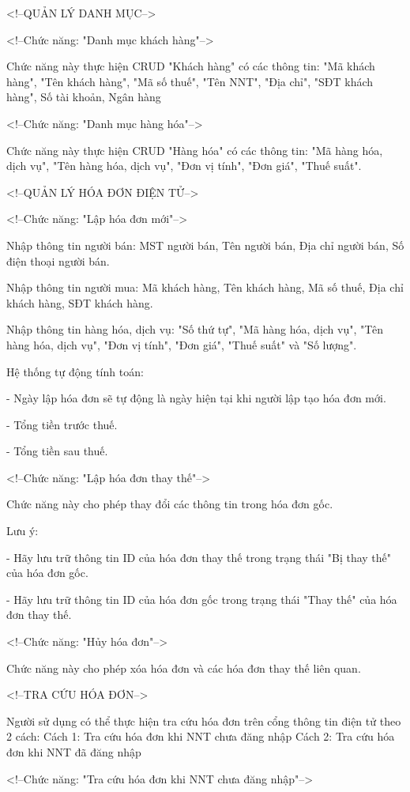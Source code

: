 <!--QUẢN LÝ DANH MỤC-->

<!--Chức năng: "Danh mục khách hàng"-->

Chức năng này thực hiện CRUD "Khách hàng" có các thông tin: "Mã khách hàng", "Tên khách hàng", "Mã số thuế", "Tên NNT", "Địa chỉ", "SĐT khách hàng", Số tài khoản, Ngân hàng

<!--Chức năng: "Danh mục hàng hóa"-->

Chức năng này thực hiện CRUD "Hàng hóa" có các thông tin: "Mã hàng hóa, dịch vụ", "Tên hàng hóa, dịch vụ", "Đơn vị tính", "Đơn giá", "Thuế suất".

<!--QUẢN LÝ HÓA ĐƠN ĐIỆN TỬ-->

<!--Chức năng: "Lập hóa đơn mới"-->

Nhập thông tin người bán: MST người bán, Tên người bán, Địa chỉ người bán, Số điện thoại người bán.

Nhập thông tin người mua: Mã khách hàng, Tên khách hàng, Mã số thuế, Địa chỉ khách hàng, SĐT khách hàng.

Nhập thông tin hàng hóa, dịch vụ: "Số thứ tự", "Mã hàng hóa, dịch vụ", "Tên hàng hóa, dịch vụ", "Đơn vị tính", "Đơn giá", "Thuế suất" và "Số lượng".

Hệ thống tự động tính toán:

- Ngày lập hóa đơn sẽ tự động là ngày hiện tại khi người lập tạo hóa đơn mới.

- Tổng tiền trước thuế.

- Tổng tiền sau thuế.

<!--Chức năng: "Lập hóa đơn thay thế"-->

Chức năng này cho phép thay đổi các thông tin trong hóa đơn gốc.

Lưu ý:

- Hãy lưu trữ thông tin ID của hóa đơn thay thế trong trạng thái "Bị thay thế" của hóa đơn gốc.

- Hãy lưu trữ thông tin ID của hóa đơn gốc trong trạng thái "Thay thế" của hóa đơn thay thế.

<!--Chức năng: "Hủy hóa đơn"-->

Chức năng này cho phép xóa hóa đơn và các hóa đơn thay thế liên quan.

<!--TRA CỨU HÓA ĐƠN-->

Người sử dụng có thể thực hiện tra cứu hóa đơn trên cổng thông tin điện tử theo 2 cách:
Cách 1: Tra cứu hóa đơn khi NNT chưa đăng nhập
Cách 2: Tra cứu hóa đơn khi NNT đã đăng nhập

<!--Chức năng: "Tra cứu hóa đơn khi NNT chưa đăng nhập"-->

